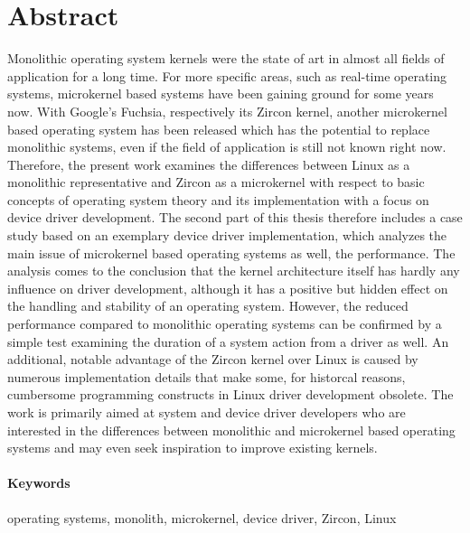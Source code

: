 \section*{Abstract}
Monolithic operating system kernels were the state of art in almost all fields of application for a long time.
For more specific areas, such as real-time operating systems, microkernel based systems have been gaining ground for some years now.
With Google's Fuchsia, respectively its Zircon kernel, another microkernel based operating system has been released which has the potential to replace monolithic systems, even if the field of application is still not known right now.
Therefore, the present work examines the differences between Linux as a monolithic representative and Zircon as a microkernel with respect to basic concepts of operating system theory and its implementation with a focus on device driver development.
The second part of this thesis therefore includes a case study based on an exemplary device driver implementation, which analyzes the main issue of microkernel based operating systems as well, the performance.
The analysis comes to the conclusion that the kernel architecture itself has hardly any influence on driver development, although it has a positive but hidden effect on the handling and stability of an operating system.
However, the reduced performance compared to monolithic operating systems can be confirmed by a simple test examining the duration of a system action from a driver as well.
An additional, notable advantage of the Zircon kernel over Linux is caused by numerous implementation details that make some, for historcal reasons, cumbersome programming constructs in Linux driver development obsolete.
The work is primarily aimed at system and device driver developers who are interested in the differences between monolithic and microkernel based operating systems and may even seek inspiration to improve existing kernels.

\paragraph{Keywords} operating systems, monolith, microkernel, device driver, Zircon, Linux


